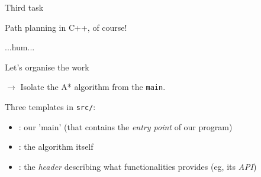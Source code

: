 \documentclass[compress]{beamer}
\begin{document}
\begin{frame}[fragile]{Third task}

Path planning in C++, of course!

    \vspace{10em}

    \small ...hum...

\end{frame}

\begin{frame}{Let's organise the work}


    $\rightarrow$ Isolate the A* algorithm from the \texttt{main}.

    Three templates in \texttt{src/}:

    \begin{itemize}
        \item<+-> : our 'main' (that contains the \emph{entry
            point} of our program) 
        \item<+-> : the algorithm itself
        \item<+-> : the \emph{header} describing what functionalities
             provides (eg, its \emph{API})

    \end{itemize}

\end{frame}
\end{document}
